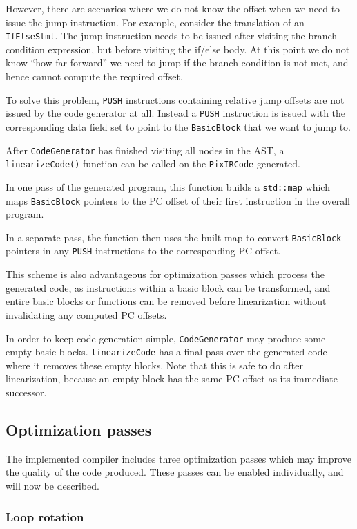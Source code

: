 \documentclass[11pt,a4paper]{scrartcl}
\begin{document}
However, there are scenarios where we do not know the offset when we need to issue the jump instruction. For example, consider the translation of an \verb|IfElseStmt|. The jump instruction needs to be issued after visiting the branch condition expression, but before visiting the if/else body. At this point we do not know ``how far forward'' we need to jump if the branch condition is not met, and hence cannot compute the required offset.

To solve this problem, \verb|PUSH| instructions containing relative jump offsets are not issued by the code generator at all. Instead a \verb|PUSH| instruction is issued with the corresponding data field set to point to the \verb|BasicBlock| that we want to jump to.

After \verb|CodeGenerator| has finished visiting all nodes in the AST, a \verb|linearizeCode()| function can be called on the \verb|PixIRCode| generated.

In one pass of the generated program, this function builds a \verb|std::map| which maps \verb|BasicBlock| pointers to the PC offset of their first instruction in the overall program.

In a separate pass, the function then uses the built map to convert \verb|BasicBlock| pointers in any \verb|PUSH| instructions to the corresponding PC offset.

This scheme is also advantageous for optimization passes which process the generated code, as instructions within a basic block can be transformed, and entire basic blocks or functions can be removed before linearization without invalidating any computed PC offsets.

In order to keep code generation simple, \verb|CodeGenerator| may produce some empty basic blocks. \verb|linearizeCode| has a final pass over the generated code where it removes these empty blocks. Note that this is safe to do after linearization, because an empty block has the same PC offset as its immediate successor.

\subsection{Optimization passes}

The implemented compiler includes three optimization passes which may improve the quality of the code produced. These passes can be enabled individually, and will now be described.

\subsubsection{Loop rotation}
\end{document}
